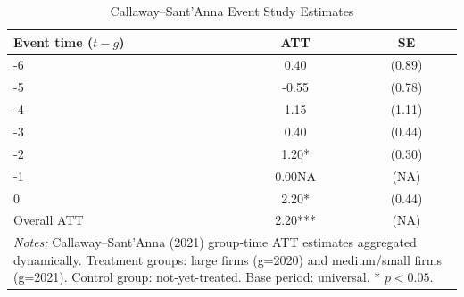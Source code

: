 \begin{table}[t]
\centering
\caption{Callaway--Sant'Anna Event Study Estimates}
\label{tab:eventstudy}
\begin{tabular}{lcc}
\toprule
Event time ($t - g$) & ATT & SE \\
\midrule
-6 & 0.40 & (0.89) \\
-5 & -0.55 & (0.78) \\
-4 & 1.15 & (1.11) \\
-3 & 0.40 & (0.44) \\
-2 & 1.20* & (0.30) \\
-1 & 0.00NA & (NA) \\
0 & 2.20* & (0.44) \\
\midrule
Overall ATT & 2.20*** & (NA) \\
\bottomrule
\multicolumn{3}{p{0.7\textwidth}}{\footnotesize \textit{Notes:} Callaway--Sant'Anna (2021) group-time ATT estimates aggregated dynamically. Treatment groups: large firms (g=2020) and medium/small firms (g=2021). Control group: not-yet-treated. Base period: universal. * $p<0.05$.} \\
\end{tabular}
\end{table}
